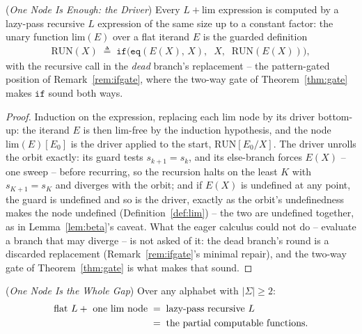 \documentclass[runningheads,envcountsect]{llncs}
\begin{document}
\begin{proposition}
    (\emph{One Node Is Enough: the Driver})
    \label{prop:limcontain}
    Every $L{+}\mathrm{lim}$ expression is computed by a lazy-pass
    recursive $L$ expression of the same size up to a constant factor:
    the unary function $\mathrm{lim}(E)$ over a flat iterand $E$ is the
    guarded definition
    \begin{align}
        \mathrm{RUN}(X) \;\triangleq\; \mathtt{if}\big(\mathtt{eq}(E(X),\, X),\;\; X,\;\; \mathrm{RUN}(E(X))\big),
    \end{align}
    with the recursive call in the \emph{dead} branch's replacement --
    the pattern-gated position of Remark~\ref{rem:ifgate}, where the
    two-way gate of Theorem~\ref{thm:gate} makes $\mathtt{if}$ sound
    both ways.
\end{proposition}

\begin{proof}
    Induction on the expression, replacing each $\mathrm{lim}$ node by
    its driver bottom-up: the iterand $E$ is then $\mathrm{lim}$-free
    by the induction hypothesis, and the node
    $\mathrm{lim}(E)[E_0]$ is the driver applied to the start,
    $\mathrm{RUN}[E_0/X]$. The driver unrolls the orbit exactly: its
    guard tests $s_{k+1} = s_k$, and its else-branch forces $E(X)$ --
    one sweep -- before recurring, so the recursion halts on the least
    $K$ with $s_{K+1} = s_K$ and diverges with the orbit; and if
    $E(X)$ is undefined at any point, the guard is undefined and so is
    the driver, exactly as the orbit's undefinedness makes the node
    undefined (Definition~\ref{def:lim}) -- the two are undefined
    together, as in Lemma~\ref{lem:beta}'s caveat. What the eager
    calculus could not do -- evaluate a branch that may diverge -- is
    not asked of it: the dead branch's round is a discarded
    replacement (Remark~\ref{rem:ifgate}'s minimal repair), and the
    two-way gate of Theorem~\ref{thm:gate} is what makes that sound.
\end{proof}

\begin{corollary}
    (\emph{One Node Is the Whole Gap})
    \label{cor:limclass}
    Over any alphabet with $|\Sigma| \geq 2$:
    \begin{align}
        \text{flat } L + \text{ one } \mathrm{lim} \text{ node}
        \;&=\; \text{lazy-pass recursive } L \notag \\
        \;&=\; \text{the partial computable functions.}
    \end{align}
\end{corollary}
\end{document}

